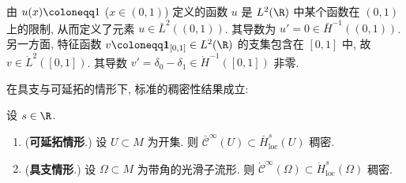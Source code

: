 \begin{example}[区间上的可延拓分布与具支分布]\label{eg:9.21}
由 $u(x) \defeq 1$ ($x \in (0, 1)$) 定义的函数 $u$ 是 $L^2(\R)$ 中某个函数在 $(0, 1)$ 上的限制, 从而定义了元素 $u \in \bar{L}^2((0, 1))$. 其导数为 $u' = 0 \in \bar{H}^{-1}((0, 1))$. 另一方面, 特征函数 $v \defeq \mathbf{1}_{[0,1]} \in L^2(\R)$ 的支集包含在 $[0, 1]$ 中, 故 $v \in \dot{L}^2([0, 1])$. 其导数 $v' = \delta_0 - \delta_1 \in \dot{H}^{-1}([0, 1])$ 非零.
\end{example}

在具支与可延拓的情形下, 标准的稠密性结果成立:

\begin{proposition}[稠密性]\label{prop:9.22}
设 $s \in \R$.
\begin{enumerate}
    \item (\textbf{可延拓情形}.) 设 $U \subset M$ 为开集. 则 $\bar{\mathcal{C}}^\infty(U) \subset \bar{H}_{\mathrm{loc}}^s(U)$ 稠密.
    \item (\textbf{具支情形}.) 设 $\Omega \subset M$ 为带角的光滑子流形. 则 $\dot{\mathcal{C}}^\infty(\Omega) \subset \dot{H}_{\mathrm{loc}}^s(\Omega)$ 稠密.
\end{enumerate}
\end{proposition}

